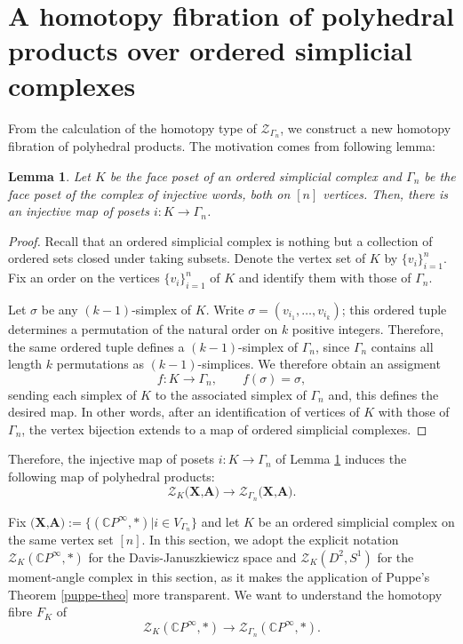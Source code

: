 \documentclass[a4paper,11pt]{article}
\newtheorem{lemma}[theorem]{Lemma}
\theoremstyle{definition}
\newcommand{\C}{\mathbb{C}}
\newcommand{\ZZ}{\mathcal{Z}}
\begin{document}
\section{A homotopy fibration of polyhedral products over ordered simplicial complexes}\label{sec-fibration}

From the calculation of the homotopy type of $\ZZ_{\Gamma_n}$, we construct a new homotopy fibration of polyhedral products. The motivation comes from following lemma:

\begin{lemma}\label{injection-ord-inj}
	Let $K$ be the face poset of an ordered simplicial complex and $\Gamma_n$ be the face poset of the complex of injective words, both on $[n]$ vertices. 
	Then, there is an injective map of posets $i: K \to \Gamma_n$.
\end{lemma}
\begin{proof}
Recall that an ordered simplicial complex is nothing but a collection of ordered sets closed under taking subsets. Denote the vertex set of $K$ by  $\{v_i\}_{i=1}^n$. Fix an order on the vertices $\{v_i\}_{i=1}^n$ of $K$ and identify them with those of $\Gamma_n$. 

Let $\sigma$ be any $(k-1)$-simplex of $K$. Write $\sigma = (v_{i_1}, \ldots, v_{i_k})$; this ordered tuple determines a permutation of the natural order on $k$ positive integers. Therefore, the same ordered tuple defines a $(k-1)$-simplex of $\Gamma_n$, since $\Gamma_n$ contains all length $k$ permutations as $(k-1)$-simplices. We therefore obtain an assigment 
\[
f: K \to \Gamma_n, \qquad f(\sigma) = \sigma,
\]
sending each simplex of $K$ to the associated simplex of $\Gamma_n$ and, this defines the desired map. In other words, after an identification of vertices of $K$ with those of $\Gamma_n$, the vertex bijection extends to a map of ordered simplicial complexes.
\end{proof}

Therefore, the injective map of posets $i: K \to \Gamma_n$ of Lemma \ref{injection-ord-inj} induces the following map of polyhedral products:
\[
\ZZ_K\textbf{(X,A)} \to \ZZ_{\Gamma_n}\textbf{(X,A)}.
\]

Fix $\textbf{(X,A)} := \{(\C P^\infty,*) | i \in V_{\Gamma_n}\}$ and let $K$ be an ordered simplicial complex on the same vertex set $[n]$. In this section, we adopt the explicit notation $\ZZ_K(\C P^\infty,*)$ for the Davis-Januszkiewicz space and $\ZZ_K(D^2,S^1)$ for the moment-angle complex in this section, as it makes the application of Puppe's Theorem \ref{puppe-theo} more transparent. We want to understand the homotopy fibre $F_K$ of 
\[
\ZZ_K(\C P^\infty,*)\to \ZZ_{\Gamma_n}(\C P^\infty,*).
\]
\end{document}
